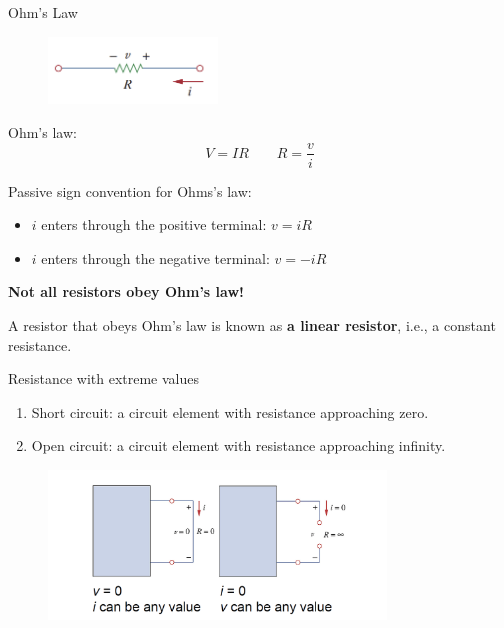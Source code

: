 \documentclass{beamer}
\begin{document}
\begin{frame}{Ohm's Law}


\begin{figure}
\centering
\includegraphics[width=0.4\textwidth]{ohm.png}
\end{figure}

Ohm's law:
$$V=IR \qquad R = \frac{v}{i}$$

Passive sign convention for Ohms's law:
\begin{itemize}
    \item $i$ enters through the positive terminal: $v=iR$
    \item $i$ enters through the negative terminal: $v=-iR$
\end{itemize}


\textbf{Not all resistors obey Ohm's law!}

A resistor that obeys Ohm's law is known as \textbf{a linear resistor}, i.e., a constant resistance.

\end{frame}

\begin{frame}{Resistance with extreme values}
\begin{enumerate}
    \item Short circuit: a circuit element with resistance approaching zero.
    \item Open circuit: a circuit element with resistance approaching infinity.
\end{enumerate}
\begin{figure}
\centering
\includegraphics[width=0.8\textwidth]{16.png}
\end{figure}
\end{frame}
\end{document}
